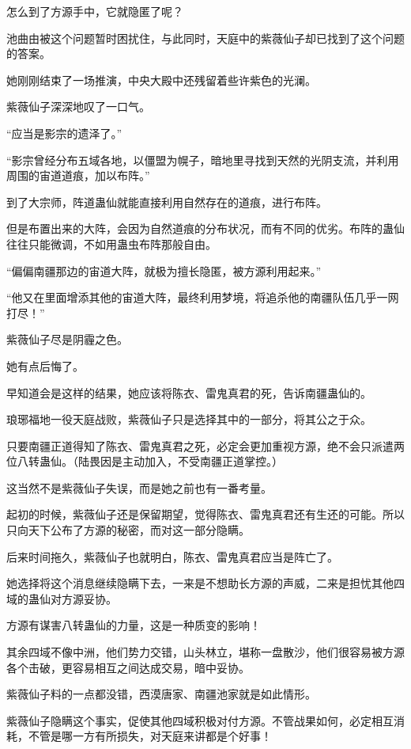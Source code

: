 \begin{this_body}
怎么到了方源手中，它就隐匿了呢？

池曲由被这个问题暂时困扰住，与此同时，天庭中的紫薇仙子却已找到了这个问题的答案。

她刚刚结束了一场推演，中央大殿中还残留着些许紫色的光澜。

紫薇仙子深深地叹了一口气。

“应当是影宗的遗泽了。”

“影宗曾经分布五域各地，以僵盟为幌子，暗地里寻找到天然的光阴支流，并利用周围的宙道道痕，加以布阵。”

到了大宗师，阵道蛊仙就能直接利用自然存在的道痕，进行布阵。

但是布置出来的大阵，会因为自然道痕的分布状况，而有不同的优劣。布阵的蛊仙往往只能微调，不如用蛊虫布阵那般自由。

“偏偏南疆那边的宙道大阵，就极为擅长隐匿，被方源利用起来。”

“他又在里面增添其他的宙道大阵，最终利用梦境，将追杀他的南疆队伍几乎一网打尽！”

紫薇仙子尽是阴霾之色。

她有点后悔了。

早知道会是这样的结果，她应该将陈衣、雷鬼真君的死，告诉南疆蛊仙的。

琅琊福地一役天庭战败，紫薇仙子只是选择其中的一部分，将其公之于众。

只要南疆正道得知了陈衣、雷鬼真君之死，必定会更加重视方源，绝不会只派遣两位八转蛊仙。（陆畏因是主动加入，不受南疆正道掌控。）

这当然不是紫薇仙子失误，而是她之前也有一番考量。

起初的时候，紫薇仙子还是保留期望，觉得陈衣、雷鬼真君还有生还的可能。所以只向天下公布了方源的秘密，而对这一部分隐瞒。

后来时间拖久，紫薇仙子也就明白，陈衣、雷鬼真君应当是阵亡了。

她选择将这个消息继续隐瞒下去，一来是不想助长方源的声威，二来是担忧其他四域的蛊仙对方源妥协。

方源有谋害八转蛊仙的力量，这是一种质变的影响！

其余四域不像中洲，他们势力交错，山头林立，堪称一盘散沙，他们很容易被方源各个击破，更容易相互之间达成交易，暗中妥协。

紫薇仙子料的一点都没错，西漠唐家、南疆池家就是如此情形。

紫薇仙子隐瞒这个事实，促使其他四域积极对付方源。不管战果如何，必定相互消耗，不管是哪一方有所损失，对天庭来讲都是个好事！


\end{this_body}
